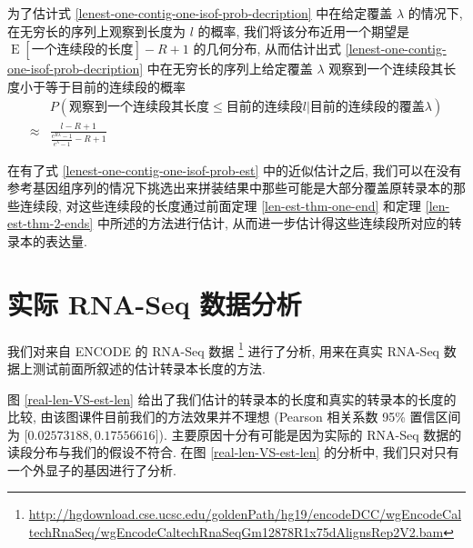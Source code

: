 为了估计式 \eqref{lenest-one-contig-one-isof-prob-decription} 
中在给定覆盖 $\lambda$ 的情况下, 在无穷长的序列上观察到长度为 $l$ 的概率, 
我们将该分布近用一个期望是 $\operatorname{E}[\text{一个连续段的长度}] -R+1$ 的几何分布, 
从而估计出式 \ref{lenest-one-contig-one-isof-prob-decription} 
中在无穷长的序列上给定覆盖 $\lambda$ 观察到一个连续段其长度小于等于目前的连续段的概率
\begin{align}
\label{lenest-one-contig-one-isof-prob-est}
& P(\text{观察到一个连续段其长度} \leq \text{目前的连续段} l |\text{目前的连续段的覆盖} \lambda) \nonumber \\
\approx & \frac{l-R+1}{\frac{e^{R\lambda} -1}{e^{\lambda}-1} -R+1}
\end{align}

在有了式 \eqref{lenest-one-contig-one-isof-prob-est} 中的近似估计之后, 
我们可以在没有参考基因组序列的情况下挑选出来拼装结果中那些可能是大部分覆盖原转录本的那些连续段, 
对这些连续段的长度通过前面定理 \ref{len-est-thm-one-end} 和定理 
\ref{len-est-thm-2-ends} 中所述的方法进行估计, 
从而进一步估计得这些连续段所对应的转录本的表达量. 


\section{实际 RNA-Seq 数据分析}
\label{len-est-real-rna-seq}

我们对来自 ENCODE \cite{encode} 的 RNA-Seq 数据 
\footnote{\url{http://hgdownload.cse.ucsc.edu/goldenPath/hg19/encodeDCC/wgEncodeCaltechRnaSeq/wgEncodeCaltechRnaSeqGm12878R1x75dAlignsRep2V2.bam}} 
进行了分析, 
用来在真实 RNA-Seq 数据上测试前面所叙述的估计转录本长度的方法. 

图 \ref{real-len-VS-est-len} 给出了我们估计的转录本的长度和真实的转录本的长度的比较, 
由该图课件目前我们的方法效果并不理想 
(Pearson 相关系数 95\% 置信区间为 $[0.02573188, 0.17556616$]). 
主要原因十分有可能是因为实际的 RNA-Seq 数据的读段分布与我们的假设不符合. 
在图 \ref{real-len-VS-est-len} 的分析中, 我们只对只有一个外显子的基因进行了分析. 

